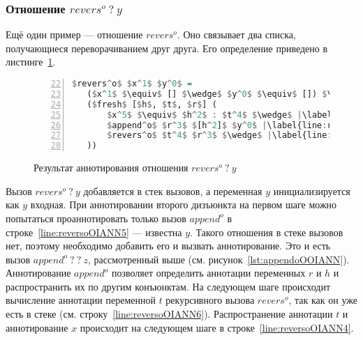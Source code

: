 
\subsubsection{Отношение $revers^o \ ? \ y$}

Ещё один пример --- отношение $revers^o$.
Оно связывает два списка, получающиеся переворачиванием друг друга.
Его определение приведено в листинге~\ref{lst:reversoOIANN}.

\begin{figure}[h!]
  \begin{center}
  \begin{minipage}{0.5\textwidth}
  \begin{lstlisting}[language=Haskell, frame=single, numbers=left,numberstyle=\small, firstnumber=22, escapechar=|]
 $revers^o$ $x^1$ $y^0$ =
   ($x^1$ $\equiv$ [] $\wedge$ $y^0$ $\equiv$ []) $\vee$ |\label{line:reversoOIANN2}|
   ($fresh$ [$h$, $t$, $r$] (
       $x^5$ $\equiv$ $h^2$ : $t^4$ $\wedge$ |\label{line:reversoOIANN4}|
       $append^o$ $r^3$ $[h^2]$ $y^0$ |\label{line:reversoOIANN5}|
       $revers^o$ $t^4$ $r^3$ $\wedge$ |\label{line:reversoOIANN6}|
   ))
    \end{lstlisting}
  \end{minipage}
  \end{center}
  \caption{Результат аннотирования отношения $revers^o \ ? \ y$}
  \label{lst:reversoOIANN}
\end{figure}

Вызов $revers^o \ ? \ y$ добавляется в стек вызовов, а переменная $y$ инициализируется как $y$ входная.
При аннотировании второго дизъюнкта на первом шаге можно попытаться проаннотировать только вызов $append^o$ в строке~\ref{line:reversoOIANN5} --- известна $y$.
Такого отношения в стеке вызовов нет, поэтому необходимо добавить его и вызвать аннотирование.
Это и есть вызов $append^o \ ? \ ? \ z$, рассмотренный выше (см. рисунок~\ref{lst:appendoOOIANN}).
Аннотирование $append^o$ позволяет определить аннотации переменных $r$ и $h$ и распространить их по другим конъюнктам.
На следующем шаге происходит вычисление аннотации переменной $t$ рекурсивного вызова $revers^o$, так как он уже есть в стеке (см. строку~\ref{line:reversoOIANN6}).
Распространение аннотации $t$ и аннотирование $x$ происходит на следующем шаге в строке~\ref{line:reversoOIANN4}.
